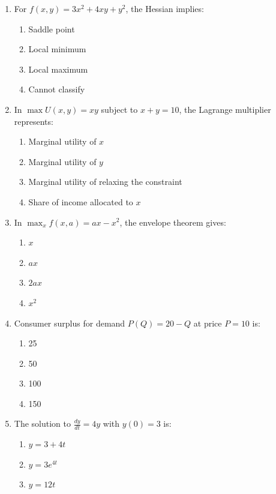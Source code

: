 \documentclass[12pt]{article}
\begin{document}
\begin{enumerate}
    \item For \(f(x,y)=3x^2 + 4xy + y^2\), the Hessian implies:
    \begin{enumerate}
        \item Saddle point
        \item Local minimum
        \item Local maximum
        \item Cannot classify
    \end{enumerate}
\vspace{0.75cm}
    \item In \(\max U(x,y)=xy\) subject to \(x+y=10\), the Lagrange multiplier represents:
    \begin{enumerate}
        \item Marginal utility of \(x\)
        \item Marginal utility of \(y\)
        \item Marginal utility of relaxing the constraint
        \item Share of income allocated to \(x\)
    \end{enumerate}
\vspace{0.75cm}
    \item In \(\max_x f(x,a)=ax - x^2\), the envelope theorem gives:
    \begin{enumerate}
        \item \(x\)
        \item \(ax\)
        \item \(2ax\)
        \item \(x^2\)
    \end{enumerate}
\vspace{0.75cm}
    \item Consumer surplus for demand \(P(Q)=20 - Q\) at price \(P=10\) is:
    \begin{enumerate}
        \item 25
        \item 50
        \item 100
        \item 150
    \end{enumerate}
\vspace{0.75cm}
    \item The solution to \(\frac{dy}{dt}=4y\) with \(y(0)=3\) is:
    \begin{enumerate}
        \item \(y=3+4t\)
        \item \(y=3 e^{4t}\)
        \item \(y=12t\)

\end{enumerate}
\end{enumerate}
\end{document}
